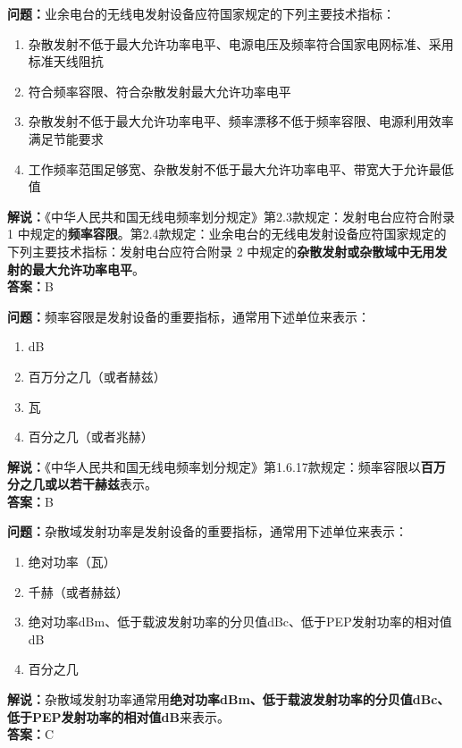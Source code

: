 \bigskip


\noindent\textbf{问题：}业余电台的无线电发射设备应符国家规定的下列主要技术指标：
\begin{enumerate}[label=\Alph*), leftmargin=3em]
\item 杂散发射不低于最大允许功率电平、电源电压及频率符合国家电网标准、采用标准天线阻抗
\item 符合频率容限、符合杂散发射最大允许功率电平
\item 杂散发射不低于最大允许功率电平、频率漂移不低于频率容限、电源利用效率满足节能要求
\item 工作频率范围足够宽、杂散发射不低于最大允许功率电平、带宽大于允许最低值
\end{enumerate}
\noindent\textbf{解说：}《中华人民共和国无线电频率划分规定》第2.3款规定：发射电台应符合附录 1 中规定的\textbf{频率容限}。第2.4款规定：业余电台的无线电发射设备应符国家规定的下列主要技术指标：发射电台应符合附录 2 中规定的\textbf{杂散发射或杂散域中无用发射的最大允许功率电平}。\\\noindent\textbf{答案：}B




\bigskip


\noindent\textbf{问题：}频率容限是发射设备的重要指标，通常用下述单位来表示：
\begin{enumerate}[label=\Alph*), leftmargin=3em]
\item dB
\item 百万分之几（或者赫兹）
\item 瓦
\item 百分之几（或者兆赫）
\end{enumerate}
\noindent\textbf{解说：}《中华人民共和国无线电频率划分规定》第1.6.17款规定：频率容限以\textbf{百万分之几或以若干赫兹}表示。\\\noindent\textbf{答案：}B




\bigskip


\noindent\textbf{问题：}杂散域发射功率是发射设备的重要指标，通常用下述单位来表示：
\begin{enumerate}[label=\Alph*), leftmargin=3em]
\item 绝对功率（瓦）
\item 千赫（或者赫兹）%
\item 绝对功率dBm、低于载波发射功率的分贝值dBc、低于PEP发射功率的相对值dB
\item 百分之几
\end{enumerate}
\noindent\textbf{解说：}杂散域发射功率通常用\textbf{绝对功率dBm、低于载波发射功率的分贝值dBc、低于PEP发射功率的相对值dB}来表示。\\\noindent\textbf{答案：}C




